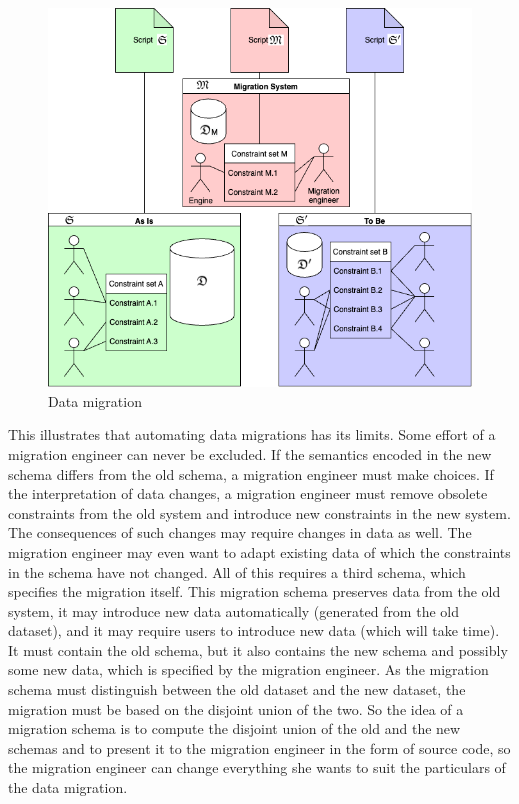 \documentclass{elsarticle}
\begin{document}
\begin{figure}[bht]
   \begin{center}
     \includegraphics[scale=.35]{Migration.png}
   \end{center}
\caption{Data migration}
\label{fig:event flow}
\end{figure}
   This illustrates that automating data migrations has its limits.
   Some effort of a migration engineer can never be excluded.
   If the semantics encoded in the new schema differs from the old schema,
   a migration engineer must make choices.
   If the interpretation of data changes,
   a migration engineer must remove obsolete constraints from the old system and introduce new constraints in the new system.
   The consequences of such changes may require changes in data as well.
   The migration engineer may even want to adapt existing data of which the constraints in the schema have not changed.
   All of this requires a third schema, which specifies the migration itself.
   This migration schema preserves data from the old system, it may introduce new data automatically (generated from the old dataset),
   and it may require users to introduce new data (which will take time). 
   It must contain the old schema, but it also contains the new schema and possibly some new data, which is specified by the migration engineer.
   As the migration schema must distinguish between the old dataset and the new dataset,
   the migration must be based on the disjoint union of the two.
   So the idea of a migration schema is to compute the disjoint union of the old and the new schemas
   and to present it to the migration engineer in the form of source code,
   so the migration engineer can change everything she wants to suit the particulars of the data migration.
\end{document}
